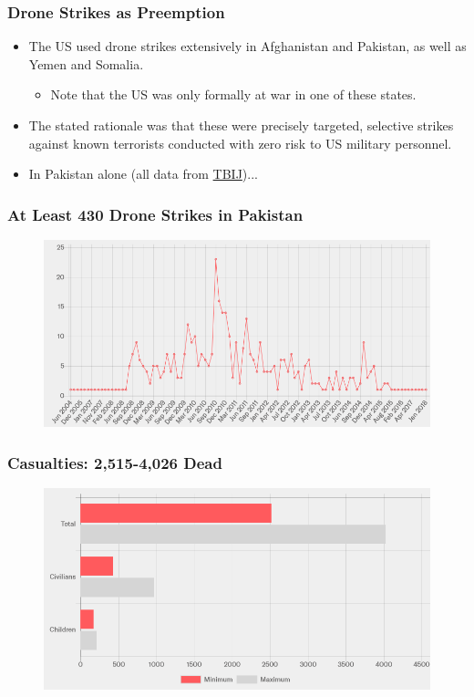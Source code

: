 \documentclass[handout]{beamer}
\begin{document}
\begin{frame} 
	\frametitle{\LARGE{Drone Strikes as Preemption}}
	\begin{itemize}
		\item The US used drone strikes extensively in Afghanistan and Pakistan, as well as Yemen and Somalia. \pause
		\begin{itemize}
			\item Note that the US was only formally at war in one of these states. \pause
		\end{itemize}
		\item The stated rationale was that these were precisely targeted, selective strikes against known terrorists conducted with zero risk to US military personnel. \pause
		\item In Pakistan alone (all data from \href{https://www.thebureauinvestigates.com/projects/drone-war}{TBIJ})... 
	\end{itemize}
\end{frame}

\begin{frame} 
	\frametitle{\LARGE{At Least 430 Drone Strikes in Pakistan}}
	\begin{figure}[ht!]
	\centering
	\includegraphics[width=\textwidth,height=\textheight,keepaspectratio]{Pakstrikes.png}
\end{figure}
\end{frame}

\begin{frame} 
	\frametitle{\LARGE{Casualties: 2,515-4,026 Dead}}
	\begin{figure}[ht!]
		\centering
		\includegraphics[width=\textwidth,height=\textheight,keepaspectratio]{Pakcas.png}
	\end{figure}
\end{frame}
\end{document}
